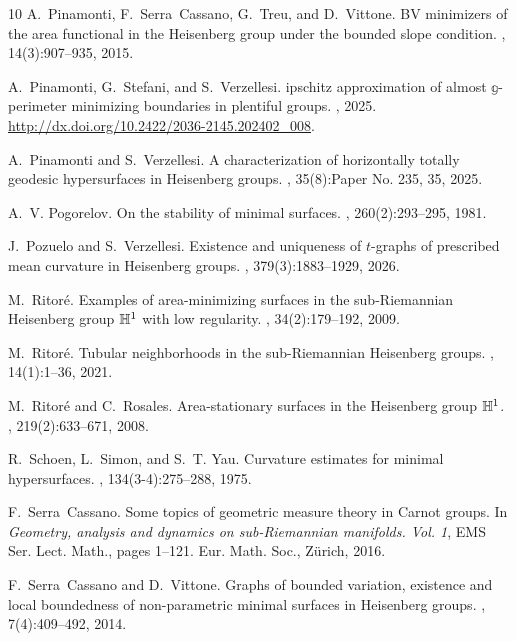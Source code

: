 \begin{thebibliography}{10}
A.~Pinamonti, F.~Serra~Cassano, G.~Treu, and D.~Vittone.
\newblock B{V} minimizers of the area functional in the {H}eisenberg group under the bounded slope condition.
, 14(3):907--935, 2015.

A.~Pinamonti, G.~Stefani, and S.~Verzellesi.
ipschitz approximation of almost $\mathbb g$-perimeter minimizing boundaries in plentiful groups.
, 2025.
\newblock \url{http://dx.doi.org/10.2422/2036-2145.202402_008}.

A.~Pinamonti and S.~Verzellesi.
\newblock A characterization of horizontally totally geodesic hypersurfaces in {H}eisenberg groups.
, 35(8):Paper No. 235, 35, 2025.

A.~V. Pogorelov.
\newblock On the stability of minimal surfaces.
, 260(2):293--295, 1981.

J.~Pozuelo and S.~Verzellesi.
\newblock Existence and uniqueness of {$t$}-graphs of prescribed mean curvature in {H}eisenberg groups.
, 379(3):1883--1929, 2026.

M.~Ritor\'{e}.
\newblock Examples of area-minimizing surfaces in the sub-{R}iemannian {H}eisenberg group {$\Bbb H^1$} with low regularity.
, 34(2):179--192, 2009.

M.~Ritor\'{e}.
\newblock Tubular neighborhoods in the sub-{R}iemannian {H}eisenberg groups.
, 14(1):1--36, 2021.

M.~Ritor\'{e} and C.~Rosales.
\newblock Area-stationary surfaces in the {H}eisenberg group {$\Bbb H^1$}.
, 219(2):633--671, 2008.

R.~Schoen, L.~Simon, and S.~T. Yau.
\newblock Curvature estimates for minimal hypersurfaces.
, 134(3-4):275--288, 1975.

F.~Serra~Cassano.
\newblock Some topics of geometric measure theory in {C}arnot groups.
\newblock In {\em Geometry, analysis and dynamics on sub-{R}iemannian manifolds. {V}ol. 1}, EMS Ser. Lect. Math., pages 1--121. Eur. Math. Soc., Z\"{u}rich, 2016.

F.~Serra~Cassano and D.~Vittone.
\newblock Graphs of bounded variation, existence and local boundedness of non-parametric minimal surfaces in {H}eisenberg groups.
, 7(4):409--492, 2014.


\end{thebibliography}
